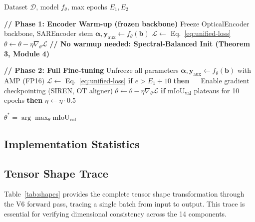 \begin{algorithm}[h]
\caption{Two-Phase Training Protocol}
\label{alg:training}
\begin{algorithmic}[1]
\Require Dataset $\mathcal{D}$, model $f_\theta$, max epochs $E_1, E_2$

\State \textbf{// Phase 1: Encoder Warm-up (frozen backbone)}
        \State Freeze OpticalEncoder backbone, SAREncoder stem
        \State $\boldsymbol{\alpha}, \mathbf{y}_{\text{aux}} \gets
        f_\theta(\mathbf{b})$ 
        \State $\mathcal{L} \gets$ Eq.~\eqref{eq:unified-loss}
        \State $\theta \gets \theta - \eta \nabla_\theta\mathcal{L}$
        \State \textbf{// No warmup needed: Spectral-Balanced Init (Theorem 3, Module 4)}
    \EndFor
\EndFor

\State \textbf{// Phase 2: Full Fine-tuning}
        \State Unfreeze all parameters
        \State $\boldsymbol{\alpha}, \mathbf{y}_{\text{aux}} \gets
        f_\theta(\mathbf{b})$ with AMP (FP16)
        \State $\mathcal{L} \gets$ Eq.~\eqref{eq:unified-loss}
        \State \textbf{if} $e > E_1 + 10$ \textbf{then}
            \State $\quad$ Enable gradient checkpointing (SIREN, OT aligner)
        \State $\theta \gets \theta - \eta \nabla_\theta\mathcal{L}$
    \EndFor
    \State \textbf{if} $\text{mIoU}_{\text{val}}$ plateaus for 10 epochs
        \textbf{then} $\eta \gets \eta \cdot 0.5$
\EndFor

\State \Return $\theta^* = \arg\max_\theta \text{mIoU}_{\text{val}}$
\end{algorithmic}
\end{algorithm}

\subsection{Implementation Statistics}

\subsection{Tensor Shape Trace}

Table~\ref{tab:shapes} provides the complete tensor shape transformation through
the V6 forward pass, tracing a single batch from input to output. This trace
is essential for verifying dimensional consistency across the 14 components.


